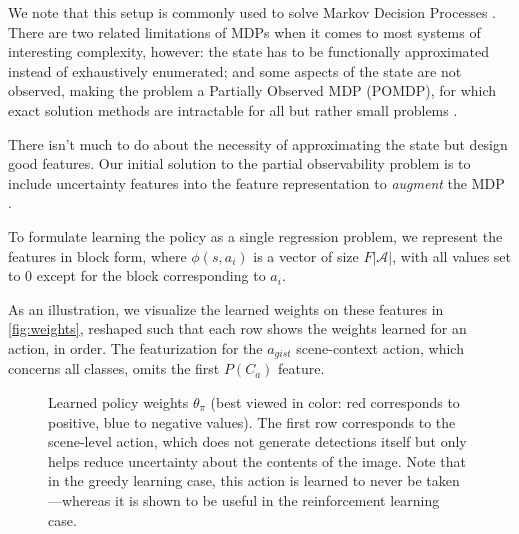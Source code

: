 We note that this setup is commonly used to solve Markov Decision Processes \cite{Sutton1998}.
There are two related limitations of MDPs when it comes to most systems of interesting complexity, however: the state has to be functionally approximated instead of exhaustively enumerated; and some aspects of the state are not observed, making the problem a Partially Observed MDP (POMDP), for which exact solution methods are intractable for all but rather small problems \cite{Roy2002}.

There isn't much to do about the necessity of approximating the state but design good features.
Our initial solution to the partial observability problem is to include uncertainty features into the feature representation to \emph{augment} the MDP \cite{Kwok2004}.

To formulate learning the policy as a single regression problem, we represent the features in block form, where $\phi(s,a_i)$ is a vector of size $F|\mathcal{A}|$, with all values set to $0$ except for the block corresponding to $a_i$.

As an illustration, we visualize the learned weights on these features in \autoref{fig:weights}, reshaped such that each row shows the weights learned for an action, in order.
The featurization for the $a_{gist}$ scene-context action, which concerns all classes, omits the first $P(C_a)$ feature.

\begin{figure}[h!]
\centering
{}
\caption{
Learned policy weights $\theta_\pi$ (best viewed in color: red corresponds to positive, blue to negative values).
The first row corresponds to the scene-level action, which does not generate detections itself but only helps reduce uncertainty about the contents of the image.
Note that in the greedy learning case, this action is learned to never be taken---whereas it is shown to be useful in the reinforcement learning case.
}
\label{fig:weights}
\end{figure}


